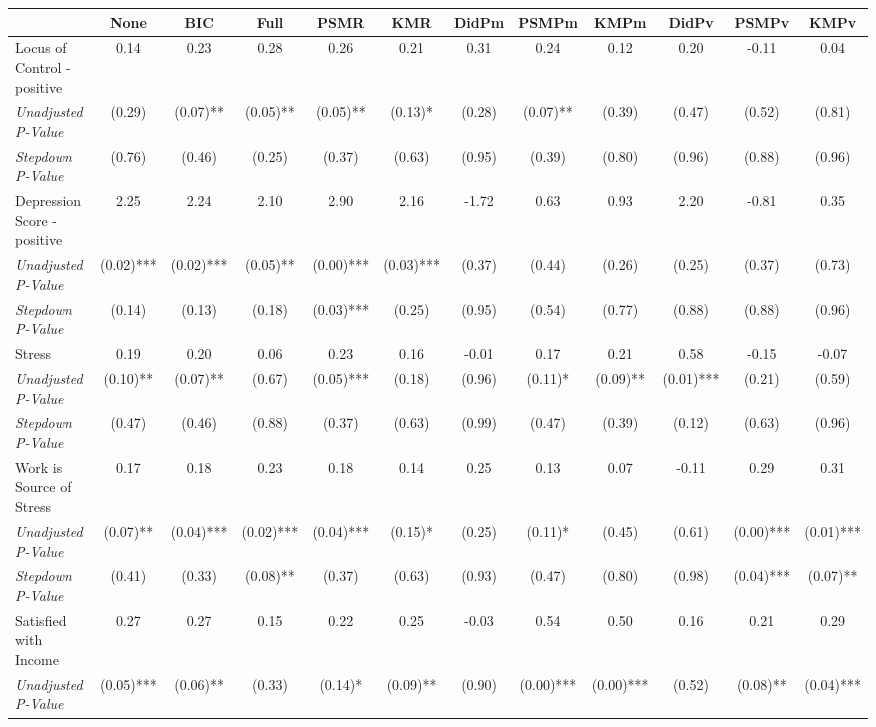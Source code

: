 \begin{tabular}{l c c c c c c c c c c c}
\toprule
 & None & BIC & Full & PSMR & KMR & DidPm & PSMPm & KMPm & DidPv & PSMPv & KMPv \\
\midrule
Locus of Control - positive & 0.14 & 0.23 & 0.28 & 0.26 & 0.21 & 0.31 & 0.24 & 0.12 & 0.20 & -0.11 & 0.04 \\
\quad \textit{Unadjusted P-Value} & (0.29) & (0.07)** & (0.05)** & (0.05)** & (0.13)* & (0.28) & (0.07)** & (0.39) & (0.47) & (0.52) & (0.81) \\
\quad \textit{Stepdown P-Value} & (0.76) & (0.46) & (0.25) & (0.37) & (0.63) & (0.95) & (0.39) & (0.80) & (0.96) & (0.88) & (0.96) \\
Depression Score - positive & 2.25 & 2.24 & 2.10 & 2.90 & 2.16 & -1.72 & 0.63 & 0.93 & 2.20 & -0.81 & 0.35 \\
\quad \textit{Unadjusted P-Value} & (0.02)*** & (0.02)*** & (0.05)** & (0.00)*** & (0.03)*** & (0.37) & (0.44) & (0.26) & (0.25) & (0.37) & (0.73) \\
\quad \textit{Stepdown P-Value} & (0.14) & (0.13) & (0.18) & (0.03)*** & (0.25) & (0.95) & (0.54) & (0.77) & (0.88) & (0.88) & (0.96) \\
Stress & 0.19 & 0.20 & 0.06 & 0.23 & 0.16 & -0.01 & 0.17 & 0.21 & 0.58 & -0.15 & -0.07 \\
\quad \textit{Unadjusted P-Value} & (0.10)** & (0.07)** & (0.67) & (0.05)*** & (0.18) & (0.96) & (0.11)* & (0.09)** & (0.01)*** & (0.21) & (0.59) \\
\quad \textit{Stepdown P-Value} & (0.47) & (0.46) & (0.88) & (0.37) & (0.63) & (0.99) & (0.47) & (0.39) & (0.12) & (0.63) & (0.96) \\
Work is Source of Stress & 0.17 & 0.18 & 0.23 & 0.18 & 0.14 & 0.25 & 0.13 & 0.07 & -0.11 & 0.29 & 0.31 \\
\quad \textit{Unadjusted P-Value} & (0.07)** & (0.04)*** & (0.02)*** & (0.04)*** & (0.15)* & (0.25) & (0.11)* & (0.45) & (0.61) & (0.00)*** & (0.01)*** \\
\quad \textit{Stepdown P-Value} & (0.41) & (0.33) & (0.08)** & (0.37) & (0.63) & (0.93) & (0.47) & (0.80) & (0.98) & (0.04)*** & (0.07)** \\
Satisfied with Income & 0.27 & 0.27 & 0.15 & 0.22 & 0.25 & -0.03 & 0.54 & 0.50 & 0.16 & 0.21 & 0.29 \\
\quad \textit{Unadjusted P-Value} & (0.05)*** & (0.06)** & (0.33) & (0.14)* & (0.09)** & (0.90) & (0.00)*** & (0.00)*** & (0.52) & (0.08)** & (0.04)*** \\

\end{tabular}
